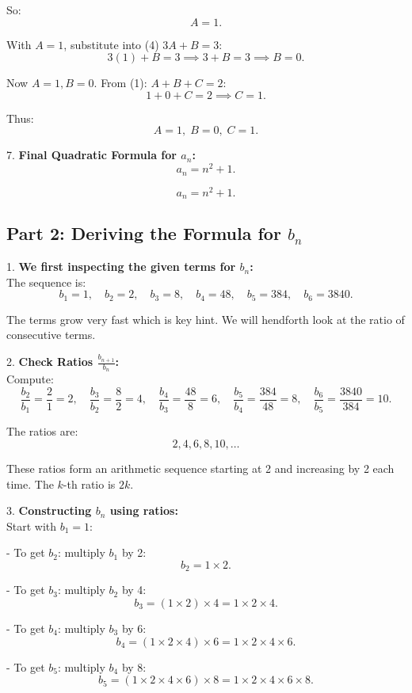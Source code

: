 \documentclass[12pt,a4paper]{article}
\begin{document}
So:
\[
A=1.
\]

With \( A=1 \), substitute into (4) \(3A+B=3\):
\[
3(1)+B=3 \implies 3+B=3 \implies B=0.
\]

Now \( A=1,B=0 \). From (1): \(A+B+C=2\):
\[
1+0+C=2 \implies C=1.
\]

Thus:
\[
A=1,\; B=0,\; C=1.
\]

7. \textbf{Final Quadratic Formula for \( a_n \):} \\
\[
a_n = n^2 + 1.
\]

\[
\boxed{a_n = n^2 + 1.}
\]

\subsection*{Part 2: Deriving the Formula for $b_n$}

1. \textbf{We first inspecting the given terms for $b_n$:} \\
The sequence is:
\[
b_1=1,\quad b_2=2,\quad b_3=8,\quad b_4=48,\quad b_5=384,\quad b_6=3840.
\]

The terms grow very fast which is key hint. We will hendforth look at the ratio of consecutive terms.

\bigskip

2. \textbf{Check Ratios \(\frac{b_{n+1}}{b_n}\):} \\
Compute:
\[
\frac{b_2}{b_1}=\frac{2}{1}=2,\quad \frac{b_3}{b_2}=\frac{8}{2}=4,\quad \frac{b_4}{b_3}= \frac{48}{8}=6,\quad \frac{b_5}{b_4}=\frac{384}{48}=8,\quad \frac{b_6}{b_5}=\frac{3840}{384}=10.
\]

The ratios are:
\[
2,4,6,8,10,\dots
\]

These ratios form an arithmetic sequence starting at 2 and increasing by 2 each time. The \(k\)-th ratio is \(2k\).

\bigskip

3. \textbf{Constructing $b_n$ using ratios:} \\
Start with \( b_1=1 \):

- To get \( b_2 \): multiply \( b_1 \) by 2:
\[
b_2 = 1\times 2.
\]

- To get \( b_3 \): multiply \( b_2 \) by 4:
\[
b_3 = (1\times 2)\times 4 = 1\times 2\times 4.
\]

- To get \( b_4 \): multiply \( b_3 \) by 6:
\[
b_4 = (1\times 2\times 4)\times 6 = 1\times 2\times 4\times 6.
\]

- To get \( b_5 \): multiply \( b_4 \) by 8:
\[
b_5 = (1\times 2\times 4\times 6)\times 8 = 1\times2\times4\times6\times8.
\]
\end{document}
